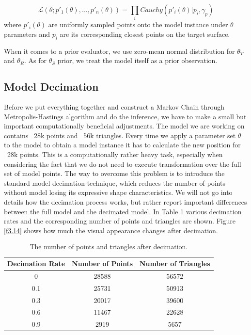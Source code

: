 \begin{equation}
  \mathcal L(\theta; p'_1(\theta), \dots, p'_n(\theta)) = \prod_i Cauchy(p'_i(\theta) |p_i, \gamma_p)
  \label{eq3.3}
\end{equation}
where $p'_i(\theta)$ are uniformly sampled points onto the model instance under $\theta$ parameters and $p_i$ are its corresponding closest points on the target surface.\bigskip

When it comes to a prior evaluator, we use zero-mean normal distribution for $\theta_T$ and $\theta_R$. As for $\theta_S$ prior, we treat the model itself as a prior observation. \cite{scalismoTut}

\subsection*{Model Decimation}
Before we put everything together and construct a Markov Chain through Metropolis-Hastings algorithm and do the inference, we have to make a small but important computationally beneficial adjustments. The model we are working on contains ~28k points and ~56k triangles. Every time we apply a parameter set $\theta$ to the model to obtain a model instance it has to calculate the new position for ~28k points. This is a computationally rather heavy task, especially when considering the fact that we do not need to execute transformation over the full set of model points. The way to overcome this problem is to introduce the standard model decimation technique, which reduces the number of points without model losing its expressive shape characteristics. We will not go into details how the decimation process works, but rather report important differences between the full model and the decimated model. In Table \ref{t3.2}  various decimation rates and the corresponding number of points and triangles are shown. Figure \ref{f3.14} shows how much the visual appearance changes after decimation. 

\begin{table}[h]
  \centering
  \begin{tabular}{c|c|c}
    Decimation Rate  & Number of Points & Number of Triangles\\
    \hline
    0   & 28588  & 56572\\
    \hline
    0.1   & 25731 & 50913 \\
    \hline
    0.3   & 20017 & 39600 \\
    \hline
    0.6   & 11467 & 22628 \\
    \hline
    0.9   & 2919 & 5657 \\
    \hline
  \end{tabular}
  \caption{The number of points and triangles after decimation.}
  \label{t3.2}
\end{table}

